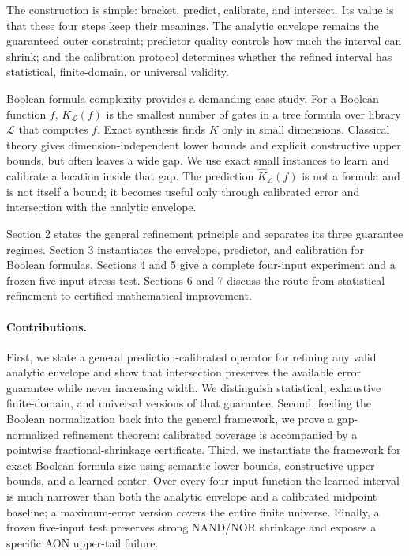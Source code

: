 \documentclass[10pt]{article}
\newcommand{\Khat}{\widehat K_{\mathcal L}}
\begin{document}
The construction is simple: bracket, predict, calibrate, and
intersect.  Its value is that these four steps keep their meanings.  The
analytic envelope remains the guaranteed outer constraint; predictor quality
controls how much the interval can shrink; and the calibration protocol
determines whether the refined interval has statistical, finite-domain, or
universal validity.

Boolean formula complexity provides a demanding case study.  For a Boolean
function $f$, $K_{\mathcal L}(f)$ is the smallest number of gates in a tree
formula over library $\mathcal L$ that computes $f$.  Exact synthesis finds
$K$ only in small dimensions.  Classical theory gives dimension-independent
lower bounds and explicit constructive upper bounds, but often leaves a wide
gap.  We use exact small instances to learn and calibrate a location inside
that gap.  The prediction $\Khat(f)$ is not a formula and is not itself a
bound; it becomes useful only through calibrated error and intersection with
the analytic envelope.

Section 2 states the general refinement principle and separates its three
guarantee regimes.  Section 3 instantiates the envelope, predictor, and
calibration for Boolean formulas.  Sections 4 and 5 give a complete four-input
experiment and a frozen five-input stress test.  Sections 6 and 7 discuss the
route from statistical refinement to certified mathematical improvement.

\paragraph{Contributions.}  First, we state a general prediction-calibrated
operator for refining any valid analytic envelope and show that intersection
preserves the available error guarantee while never increasing width.  We
distinguish statistical, exhaustive finite-domain, and universal versions of
that guarantee.  Second, feeding the Boolean normalization back into the
general framework, we prove a gap-normalized refinement theorem: calibrated
coverage is accompanied by a pointwise fractional-shrinkage certificate.
Third, we instantiate the framework for exact Boolean
formula size using semantic lower bounds, constructive upper bounds, and a
learned center.  Over every four-input function the learned interval is much
narrower than both the analytic envelope and a calibrated midpoint baseline;
a maximum-error version covers the entire finite universe.  Finally, a frozen
five-input test preserves strong NAND/NOR shrinkage and exposes a specific AON
upper-tail failure.
\end{document}
